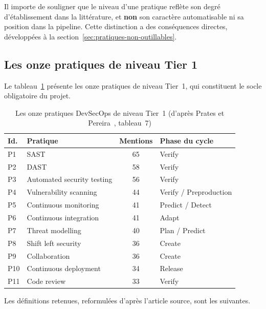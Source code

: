 Il importe de souligner que le niveau d'une pratique reflète son degré
d'établissement dans la littérature, et \textbf{non} son caractère automatisable
ni sa position dans la pipeline. Cette distinction a des conséquences directes,
développées à la section~\ref{sec:pratiques-non-outillables}.

\subsection{Les onze pratiques de niveau Tier 1}

Le tableau~\ref{tab:tier1} présente les onze pratiques de niveau Tier~1, qui
constituent le socle obligatoire du projet.

\begin{table}[H]
\centering
\caption{Les onze pratiques DevSecOps de niveau Tier~1 (d'après
Prates et Pereira~\cite{prates2025}, tableau~7)}
\label{tab:tier1}
\small
\begin{tabular}{@{}llcl@{}}
\toprule
\textbf{Id.} & \textbf{Pratique} & \textbf{Mentions} & \textbf{Phase du cycle} \\
\midrule
P1  & SAST                        & 65 & Verify \\
P2  & DAST                        & 58 & Verify \\
P3  & Automated security testing  & 56 & Verify \\
P4  & Vulnerability scanning      & 44 & Verify / Preproduction \\
P5  & Continuous monitoring       & 41 & Predict / Detect \\
P6  & Continuous integration      & 41 & Adapt \\
P7  & Threat modelling            & 40 & Plan / Predict \\
P8  & Shift left security         & 36 & Create \\
P9  & Collaboration               & 36 & Create \\
P10 & Continuous deployment       & 34 & Release \\
P11 & Code review                 & 33 & Verify \\
\bottomrule
\end{tabular}
\end{table}

Les définitions retenues, reformulées d'après l'article source, sont les
suivantes.

